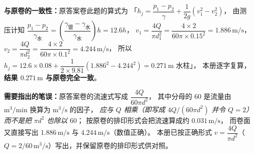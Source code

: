 \begin{tishi}
\textbf{与原卷的一致性：}原答案卷此题的算式为
「$h_j=\dfrac{p_1-p_2}{\gamma}+\dfrac{1}{2g}\left(v_1^{2}-v_2^{2}\right)$，
由测压计知 $\dfrac{p_1-p_2}{\gamma_{\text{水}}}=\left(\dfrac{\gamma_{\text{银}}-\gamma_{\text{水}}}{\gamma_{\text{水}}}\right)h=12.6h$，
$v_1=\dfrac{4Q}{\pi d_1^{2}}=\dfrac{4\times2}{60\pi\times0.15^{2}}=1.886\,\mathrm{m/s}$，
$v_2=\dfrac{4Q}{\pi d_2^{2}}=\dfrac{4\times2}{60\pi\times0.1^{2}}=4.244\,\mathrm{m/s}$，
所以 $h_j=12.6\times0.08+\dfrac{1}{2\times9.81}\left(1.886^{2}-4.244^{2}\right)=0.271\,\mathrm{m}$ 水柱」，
本册逐字复算，\textbf{结果 $0.271\,\mathrm{m}$ 与原卷完全一致}。

\textbf{需要指出的笔误：}原答案卷的流速式写成 $\dfrac{4Q}{60\pi d^{2}}$，
其中分母的 $60$ 是流量由 $\mathrm{m^{3}/min}$ 换算为 $\mathrm{m^{3}/s}$ 的因子，
\emph{应与 $Q$ 相乘（即写成 $4Q/(60\pi d^{2})$ 并令 $Q=2$）而不是把 $\pi d^{2}$ 也除以 $60$}；
按原卷的排印形式会把流速算成约 $0.031\,\mathrm{m/s}$，
而卷面又直接写出 $1.886\,\mathrm{m/s}$ 与 $4.244\,\mathrm{m/s}$（数值正确）。
本册已按正确形式 $v=\dfrac{4Q}{\pi d^{2}}$（$Q=2/60\,\mathrm{m^{3}/s}$）写出，并保留原卷的排印形式供对照。
\end{tishi}
